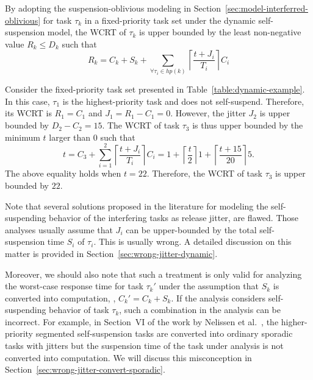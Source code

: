 By adopting the suspension-oblivious modeling in Section~\ref{sec:model-interferred-oblivious} for task $\tau_k$ in a fixed-priority task set under the dynamic self-suspension model, the WCRT of $\tau_k$ is upper bounded by the least non-negative value $R_k \leq D_k$ such that 
\begin{equation*}
R_k=C_k+S_k+ \sum_{\forall \tau_i \in hp(k)} \left\lceil \frac{t + J_i}{T_i} \right\rceil C_i
\end{equation*} 


\begin{example}
\label{ex:suspension-jitter}    
Consider the fixed-priority task set presented in Table~\ref{table:dynamic-example}. In this case, $\tau_1$ is the highest-priority task and does not self-suspend. Therefore, its WCRT is $R_1 = C_1$ and $J_1 = R_1 - C_1 = 0$. However, the jitter $J_2$ is upper bounded by $D_2 - C_2 =15$. The WCRT of task $\tau_3$ is thus upper bounded by the minimum $t$ larger than $0$ such that 
$$t=C_3+ \sum_{i=1}^2\left\lceil \frac{t + J_i}{T_i} \right\rceil C_i = 1+\left\lceil \frac{t}{2} \right\rceil 1 +\left\lceil \frac{t+15}{20} \right\rceil 5.$$ 
The above equality holds when $t=22$. Therefore, the WCRT of task $\tau_{3}$ is upper bounded by $22$.
\hfill\myendproof  
\end{example}

Note that several solutions proposed in the literature \cite{ECRTS-AudsleyB04,RTAS-AudsleyB04,RTCSA-KimCPKH95} for modeling the 
self-suspending behavior of the interfering tasks as release jitter, are flawed. Those analyses usually assume that $J_i$ can be 
upper-bounded by the total self-suspension time $S_i$ of $\tau_i$. This is usually wrong. A detailed discussion on this matter is 
provided in Section~\ref{sec:wrong-jitter-dynamic}. 

Moreover, we should also note that such a treatment is only valid for
analyzing the worst-case response time for task $\tau_k'$ under the
assumption that $S_k$ is converted into computation, \ie, $C_k'=C_k+S_k$. If the analysis
considers self-suspending behavior of task $\tau_k$, such a
combination in the analysis can be incorrect. For example, in Section~VI of the work by Nelissen et al.~\cite{ecrts15nelissen},
the higher-priority segmented self-suspension tasks are converted into ordinary sporadic tasks with jitters 
but the suspension time of the task under analysis is not converted into computation. 
We will discuss this misconception in Section~\ref{sec:wrong-jitter-convert-sporadic}.
 



